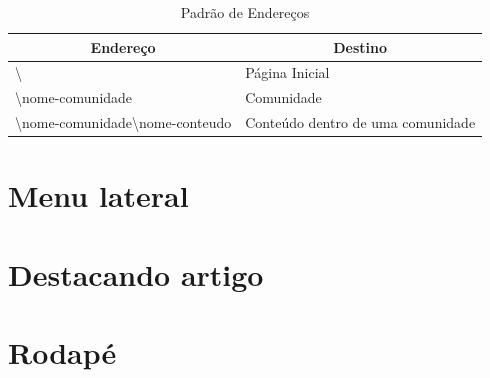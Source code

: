 \begin{table}[h]
\begin{tabular}{|l|l|}
  \hline
  \multicolumn{1}{|c|}{\textbf{Endereço}} & \multicolumn{1}{c|}{\textbf{Destino}} \\
  \hline
  \textbackslash & Página Inicial \\
  \textbackslash nome-comunidade & Comunidade \\
  \textbackslash nome-comunidade\textbackslash nome-conteudo & Conteúdo dentro de uma comunidade \\
  \hline
\end{tabular}
\caption {Padrão de Endereços}
\end{table}

\section{Menu lateral}

\section{Destacando artigo}

\section{Rodapé}